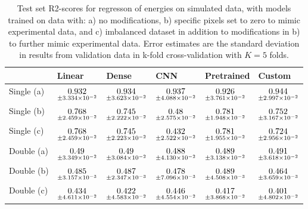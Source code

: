 \begin{table}
\centering
\caption{
Test set R2-scores for regresson of energies on simulated data, with models trained on data with: 
a) no modifications, b) specific pixels set to zero to mimic experimental data, and c) imbalanced dataset
in addition to modifications in b) to further mimic experimental data. Error estimates are the standard deviation 
in results from validation data in k-fold cross-validation with $K=5$ folds.
}
\label{tab:regression-simulated-all-energies-r2}
\begin{tabular}{llllll}
\toprule
{} &                                              Linear &                                               Dense &                                                 CNN &                                          Pretrained &                                              Custom \\
\midrule
Single (a) &  $\underset{\num{+- 3.334e-02 }  }{\num{ 0.932 } }$ &  $\underset{\num{+- 3.623e-02 }  }{\num{ 0.934 } }$ &  $\underset{\num{+- 4.088e-02 }  }{\num{ 0.937 } }$ &  $\underset{\num{+- 3.761e-02 }  }{\num{ 0.926 } }$ &  $\underset{\num{+- 2.997e-02 }  }{\num{ 0.944 } }$ \\
Single (b) &  $\underset{\num{+- 2.459e-02 }  }{\num{ 0.768 } }$ &  $\underset{\num{+- 2.222e-02 }  }{\num{ 0.745 } }$ &  $\underset{\num{+- 2.575e-02 }  }{\num{ 0.48 } }$ &  $\underset{\num{+- 1.948e-02 }  }{\num{ 0.781 } }$ &  $\underset{\num{+- 3.167e-02 }  }{\num{ 0.752 } }$ \\
Single (c) &  $\underset{\num{+- 2.459e-02 }  }{\num{ 0.768 } }$ &  $\underset{\num{+- 2.223e-02 }  }{\num{ 0.745 } }$ &  $\underset{\num{+- 2.522e-02 }  }{\num{ 0.432 } }$ &  $\underset{\num{+- 1.955e-02 }  }{\num{ 0.781 } }$ &  $\underset{\num{+- 2.956e-02 }  }{\num{ 0.724 } }$ \\
Double (a) &  $\underset{\num{+- 3.349e-02 }  }{\num{ 0.49 } }$ &  $\underset{\num{+- 3.084e-02 }  }{\num{ 0.49 } }$ &  $\underset{\num{+- 4.130e-02 }  }{\num{ 0.488 } }$ &  $\underset{\num{+- 3.138e-02 }  }{\num{ 0.489 } }$ &  $\underset{\num{+- 3.618e-02 }  }{\num{ 0.491 } }$ \\
Double (b) &  $\underset{\num{+- 3.157e-03 }  }{\num{ 0.485 } }$ &  $\underset{\num{+- 2.347e-03 }  }{\num{ 0.487 } }$ &  $\underset{\num{+- 7.096e-03 }  }{\num{ 0.478 } }$ &  $\underset{\num{+- 4.508e-03 }  }{\num{ 0.489 } }$ &  $\underset{\num{+- 3.659e-03 }  }{\num{ 0.464 } }$ \\
Double (c) &  $\underset{\num{+- 4.611e-02 }  }{\num{ 0.434 } }$ &  $\underset{\num{+- 4.583e-02 }  }{\num{ 0.422 } }$ &  $\underset{\num{+- 4.554e-02 }  }{\num{ 0.446 } }$ &  $\underset{\num{+- 3.868e-02 }  }{\num{ 0.417 } }$ &  $\underset{\num{+- 4.802e-02 }  }{\num{ 0.401 } }$ \\
\bottomrule
\end{tabular}
\end{table}
